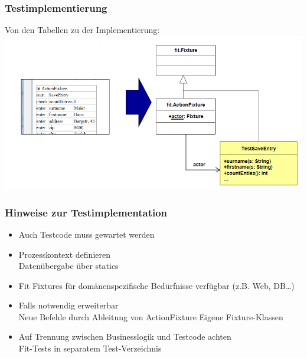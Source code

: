 \documentclass[a4paper,10pt]{article}
\begin{document}
\subsubsection{Testimplementierung}
Von den Tabellen zu der Implementierung:\\
\includegraphics[scale=0.45]{FIT_TestImplementierung.png}

\subsubsection{Hinweise zur Testimplementation}
\begin{itemize}
\item Auch Testcode muss gewartet werden
\item Prozesskontext definieren\\
Daten\"ubergabe \"uber statics 
\item Fit Fixtures f\"ur dom\"anenspezifische Bed\"urfnisse verf\"ugbar (z.B. Web, DB…)
\item Falls notwendig erweiterbar\\
Neue Befehle durch Ableitung von ActionFixture
Eigene Fixture-Klassen
\item Auf Trennung zwischen Businesslogik und Testcode achten\\
Fit-Tests in separatem Test-Verzeichnis
\end{itemize}
\end{document}
